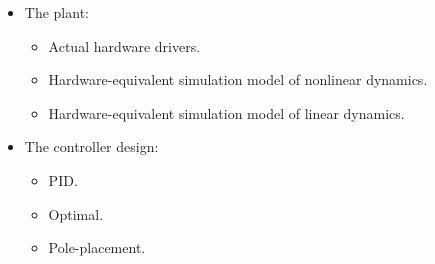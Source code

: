 \documentclass[crop=false,float=true,class=scrreprt]{standalone}
\begin{document}
\begin{itemize}[leftmargin=*,itemsep=0em, label=$\vcenter{\hbox{\tiny$\bullet$}}$]

\item The plant:
      \vspace{-1em}
      \begin{itemize}[leftmargin=*,itemsep=-1em, label=$\cdot$]
      
      \item Actual hardware drivers.
      
      \item Hardware-equivalent simulation model of nonlinear dynamics.
            
      \item Hardware-equivalent simulation model of linear dynamics.
      
      \end{itemize}

\item The controller design:
      \vspace{-1em}
      \begin{itemize}[leftmargin=*,itemsep=-1em, label=$\cdot$]
      
      \item PID.
      
      \item Optimal.
      
      \item Pole-placement.
      
      \end{itemize}

\end{itemize}




\clearpage
\end{document}
